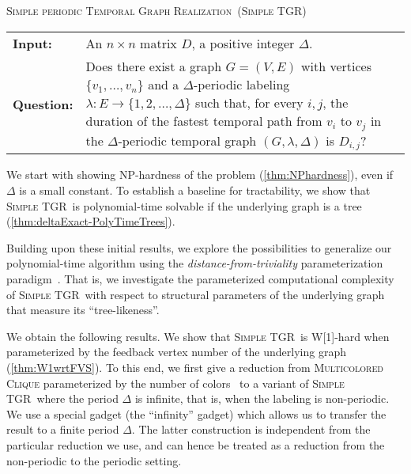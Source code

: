 \documentclass[a4paper,UKenglish,cleveref, autoref, thm-restate,anonymous]{lipics-v2021}
\makeatletter
\newcommand{\problemdef}[3]{
	\begin{center}
		\begin{minipage}{0.95\textwidth}
			\noindent
			#1
			\vspace{5pt}\\
			\setlength{\tabcolsep}{3pt}
			\begin{tabularx}{\textwidth}{@{}lX@{}}
				\textbf{Input:}& #2 \\
				\textbf{Question:}& #3
			\end{tabularx}
		\end{minipage}
	\end{center}
}
\newcommand{\deltaExactLong}{\textsc{Simple periodic Temporal Graph Realization}}
\newcommand{\deltaExact}{\textsc{Simple TGR}}
\makeatother
\begin{document}
	
\problemdef{\deltaExactLong\ (\deltaExact)}
{An $n \times n$ matrix $D$, a positive integer $\Delta$.}
{Does there exist a graph $G=(V,E)$ with vertices $\{v_1,\ldots,v_{n}\}$ 
and a $\Delta$-periodic labeling $\lambda: E \rightarrow \{1,2,\ldots,\Delta\}$ such that, 
for every $i,j$, the duration of the fastest temporal path from $v_i$ to $v_j$ in the $\Delta$-periodic temporal graph $(G,\lambda,\Delta)$ is $D_{i,j}$?}




We start with showing NP-hardness of the problem (\cref{thm:NPhardness}), even if $\Delta$ is a small constant. To establish a baseline for tractability, we show that \deltaExact\ is polynomial-time solvable if the underlying graph is a tree (\cref{thm:deltaExact-PolyTimeTrees}).

Building upon these initial results, we explore the possibilities to generalize our polynomial-time algorithm using the \emph{distance-from-triviality} parameterization paradigm~\cite{FJR13,GHN04}. That is, we investigate the parameterized computational complexity of \deltaExact\ with respect to structural parameters of the underlying graph that measure its ``tree-likeness''.

We obtain the following results. We show that \deltaExact\ is W[1]-hard when parameterized by the feedback vertex number of the underlying graph (\cref{thm:W1wrtFVS}). 
To this end, we first give a reduction from \textsc{Multicolored Clique} parameterized by the number of colors~\cite{fellows2009multipleinterval} to a variant of \deltaExact\ where the period $\Delta$ is infinite, that is, when the labeling is non-periodic. We use a special gadget (the ``infinity'' gadget) which allows us to transfer the result to a finite period $\Delta$. The latter construction is independent from the particular reduction we use, and can hence be treated as a reduction from the non-periodic to the periodic setting.
\end{document}
